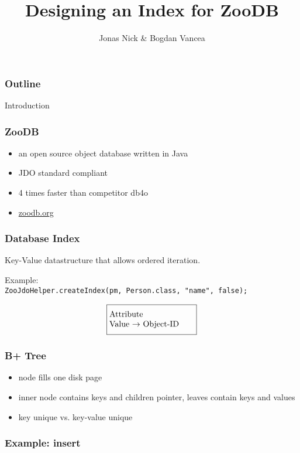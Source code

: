 \documentclass{beamer}
\title{Designing an Index for ZooDB}
\author{Jonas Nick \& Bogdan Vancea}
\begin{document}
  \frame{\titlepage}
  \begin{frame}
    \frametitle{Outline}
    \tableofcontents[hideallsubsections]
  \end{frame}

  \begin{section}{Introduction}
    \begin{frame}
      \frametitle{ZooDB}
      \begin{itemize}
        \item an open source object database written in Java
        \item JDO standard compliant
        \item 4 times faster than competitor db4o
        \item \url{zoodb.org}
      \end{itemize}

    \end{frame}
    \begin{frame}
      \frametitle{Database Index}
      \begin{block}{}
          Key-Value datastructure that allows ordered iteration.
      \end{block}
      \vspace{1em}
      \pause
      Example: \\
      \texttt{ZooJdoHelper.createIndex(pm, Person.class, "name", false);}
      \pause
      \begin{align*}
      \fbox{\parbox[t][3em][c]{0.29\textwidth}{Attribute \\ Value $\rightarrow$ Object-ID} }
      \end{align*}
      \pause
      \begin{center}
      \end{center}
    \end{frame}
    \begin{frame}
      \frametitle{B+ Tree}
      \begin{itemize}
        \item node fills one disk page
        \item inner node contains keys and children pointer, leaves contain keys and values
        \item key unique vs. key-value unique
      \end{itemize}
    \end{frame}
    \begin{frame}
      \frametitle{Example: insert}
    \end{frame}
  \end{section}
\end{document}
